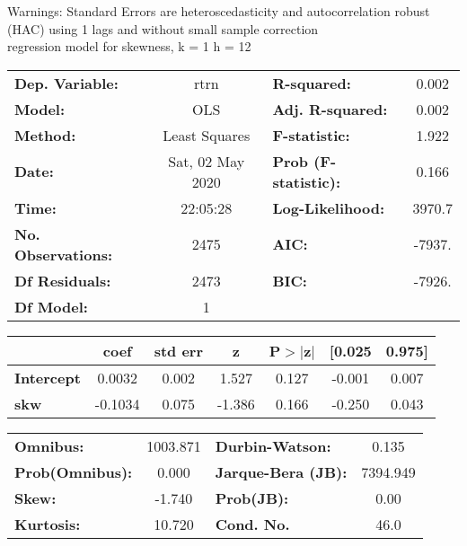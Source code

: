 Warnings: \newline
 [1] Standard Errors are heteroscedasticity and autocorrelation robust (HAC) using 1 lags and without small sample correction\\ 

regression model for skewness, k = 1 h = 12\begin{center}
\begin{tabular}{lclc}
\toprule
\textbf{Dep. Variable:}    &       rtrn       & \textbf{  R-squared:         } &     0.002   \\
\textbf{Model:}            &       OLS        & \textbf{  Adj. R-squared:    } &     0.002   \\
\textbf{Method:}           &  Least Squares   & \textbf{  F-statistic:       } &     1.922   \\
\textbf{Date:}             & Sat, 02 May 2020 & \textbf{  Prob (F-statistic):} &    0.166    \\
\textbf{Time:}             &     22:05:28     & \textbf{  Log-Likelihood:    } &    3970.7   \\
\textbf{No. Observations:} &        2475      & \textbf{  AIC:               } &    -7937.   \\
\textbf{Df Residuals:}     &        2473      & \textbf{  BIC:               } &    -7926.   \\
\textbf{Df Model:}         &           1      & \textbf{                     } &             \\
\bottomrule
\end{tabular}
\begin{tabular}{lcccccc}
                   & \textbf{coef} & \textbf{std err} & \textbf{z} & \textbf{P$> |$z$|$} & \textbf{[0.025} & \textbf{0.975]}  \\
\midrule
\textbf{Intercept} &       0.0032  &        0.002     &     1.527  &         0.127        &       -0.001    &        0.007     \\
\textbf{skw}       &      -0.1034  &        0.075     &    -1.386  &         0.166        &       -0.250    &        0.043     \\
\bottomrule
\end{tabular}
\begin{tabular}{lclc}
\textbf{Omnibus:}       & 1003.871 & \textbf{  Durbin-Watson:     } &    0.135  \\
\textbf{Prob(Omnibus):} &   0.000  & \textbf{  Jarque-Bera (JB):  } & 7394.949  \\
\textbf{Skew:}          &  -1.740  & \textbf{  Prob(JB):          } &     0.00  \\
\textbf{Kurtosis:}      &  10.720  & \textbf{  Cond. No.          } &     46.0  \\
\bottomrule
\end{tabular}
\end{center}

